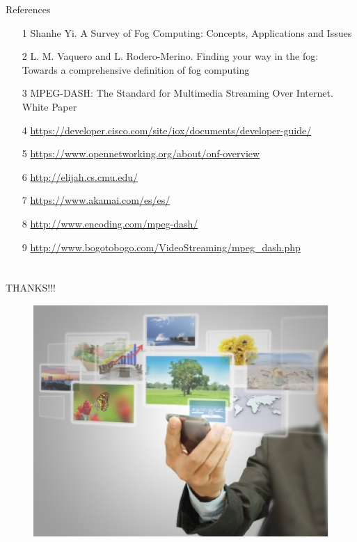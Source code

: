 \documentclass{beamer}
\begin{document}
\begin{frame}{References}
\vskip0.4cm
\small
\begin{itemize}
\item [1] Shanhe Yi. A Survey of Fog Computing: Concepts, Applications and Issues
\item [2] L. M. Vaquero and L. Rodero-Merino. Finding your way in the fog: Towards a comprehensive definition of fog computing
\item [3] MPEG-DASH: The Standard for Multimedia Streaming Over Internet. White Paper
\item [4] \url{https://developer.cisco.com/site/iox/documents/developer-guide/}
\item [5] \url{https://www.opennetworking.org/about/onf-overview}
\item [6] \url{http://elijah.cs.cmu.edu/}
\item [7] \url{https://www.akamai.com/es/es/}
\item [8] \url{http://www.encoding.com/mpeg-dash/}
\item [9] \url{http://www.bogotobogo.com/VideoStreaming/mpeg_dash.php}
\end{itemize}
\end{frame}

\section{}

\begin{frame}{\Huge{THANKS!!!}}
\vskip0.5cm
\begin{figure}
\centering
\includegraphics[scale=0.5]{images/image.eps}
\end{figure}
\end{frame}
\end{document}
